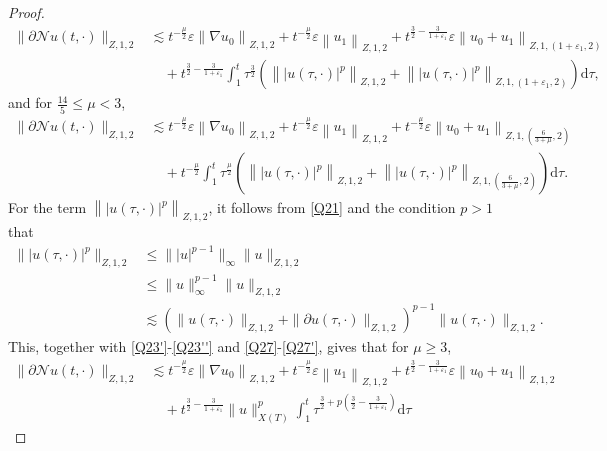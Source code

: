 \documentclass[11pt,twoside]{article}
\newcommand{\p}{\partial}
\newcommand{\ve}{\varepsilon}
\newcommand{\f}{\frac}
\theoremstyle{plain}
\theoremstyle{definition}
\theoremstyle{remark}
\numberwithin{equation}{section}
\begin{document}
\begin{proof}
\begin{equation}\label{Q27}
\begin{aligned}
\|\p\mathcal{N}u(t, \cdot)\|_{Z, 1, 2} &\lesssim t^{-\f{\mu}{2}}\ve\left\|\nabla u_0\right\|_{Z, 1, 2}
+t^{-\f{\mu}{2}}\ve\left\| u_1\right\|_{Z, 1, 2}+t^{\f32-\f{3}{1+\ve_1}}\ve\left\|u_0+u_1\right\|_{Z, 1,(1+\ve_1, 2)}\\
&\quad+ t^{\f32-\f{3}{1+\ve_1}}\int_{1}^{t} \tau^{\f32}(\left\||u(\tau, \cdot)|^p\right\|_{Z, 1,2}
+\left\||u(\tau, \cdot)|^p\right\|_{Z, 1,(1+\ve_1, 2)})\mathrm{d}\tau,
\end{aligned}
\end{equation}
and for $\f{14}{5}\leq\mu<3$,
\begin{equation}\label{Q27'}
\begin{aligned}
\|\p\mathcal{N}u(t, \cdot)\|_{Z, 1, 2} &\lesssim t^{-\f{\mu}{2}}\ve\left\|\nabla u_0\right\|_{Z, 1, 2}
+t^{-\f{\mu}{2}}\ve\left\| u_1\right\|_{Z, 1, 2}+t^{-\f{\mu}{2}}\ve\left\|u_0+u_1\right\|_{Z, 1,(\f{6}{3+\mu}, 2)}\\
&\quad+ t^{-\f{\mu}{2}}\int_{1}^{t} \tau^{\f{\mu}{2}}(\left\||u(\tau, \cdot)|^p\right\|_{Z, 1,2}
+\left\||u(\tau, \cdot)|^p\right\|_{Z, 1,(\f{6}{3+\mu}, 2)})\mathrm{d}\tau.
\end{aligned}
\end{equation}
For the term $\left\||u(\tau, \cdot)|^p\right\|_{Z, 1, 2}$,
it follows from \eqref{Q21} and the condition  $p>1$ that
\begin{equation}\label{Q23}
\begin{aligned}
\||u(\tau, \cdot)|^p\|_{Z, 1, 2}&\leq \||u|^{p-1}\|_{\infty}\|u\|_{Z, 1, 2}\\
&\leq  \|u\|^{p-1}_{\infty}\|u\|_{Z, 1, 2}\\
&\lesssim  (\|u(\tau, \cdot)\|_{Z, 1, 2}+\|\p u(\tau, \cdot)\|_{Z, 1, 2})^{p-1}\|u(\tau, \cdot)\|_{Z, 1,2}.
\end{aligned}
\end{equation}
This, together with \eqref{Q23'}-\eqref{Q23''} and \eqref{Q27}-\eqref{Q27'}, gives that for $\mu\geq3$,
$$
\begin{aligned}
\|\p \mathcal{N}u(t, \cdot)\|_{Z, 1, 2} &\lesssim t^{-\f{\mu}{2}}\ve\left\|\nabla u_0\right\|_{Z, 1, 2}
+t^{-\f{\mu}{2}}\ve\left\|u_1\right\|_{Z, 1, 2}+t^{\f32-\f{3}{1+\ve_1}}\ve\left\|u_0+u_1\right\|_{Z, 1,2}\\
&\quad+ t^{\f32-\f{3}{1+\ve_1}}\|u\|_{X(T)}^p\int_{1}^{t} \tau^{\f32+p(\f32-\f{3}{1+\ve_1})}\mathrm{d}\tau
\end{aligned}
$$
\end{proof}
\end{document}
